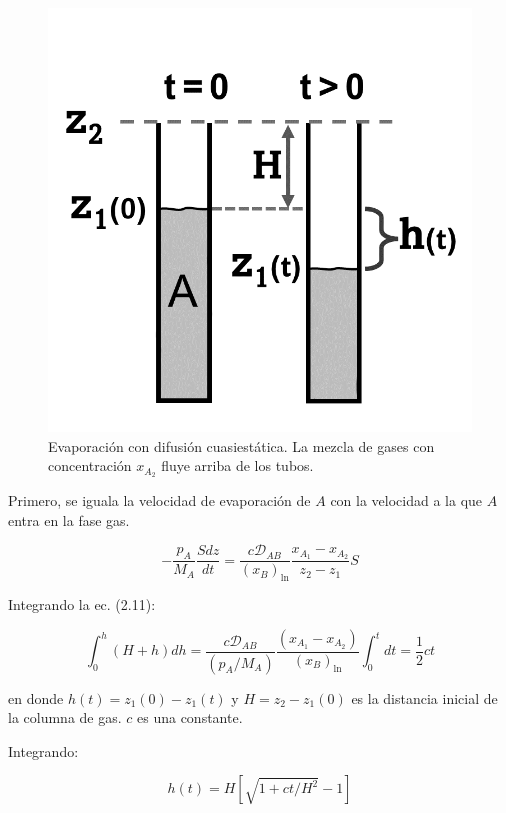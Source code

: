 \begin{figure}[H]
	\centering
	\includegraphics[scale=0.2]{./Capitulo2/Imagenes/fig-2-3.PNG}
	\caption{Evaporación con difusión cuasiestática. La mezcla de gases con concentración $x_{A_2}$ fluye arriba de los tubos.}
	\end{figure}
	
Primero, se iguala la velocidad de evaporación de $A$ con la velocidad a la que $A$ entra en la fase gas.

\begin{equation}
-\frac{p_A}{M_A} \frac{Sdz}{dt} = \frac{c \mathcal{D}_{AB}}{(x_B)_{\ln}} \frac{x_{A_1}-x_{A_2}}{z_2 - z_1} S
\end{equation}

Integrando la ec. (2.11): 

\begin{equation}
	\int_0^h (H+h)dh = \frac{c \mathcal{D}_{AB}}{(p_A/M_A)} \frac{(x_{A_1}-x_{A_2})}{(x_B)_{\ln}} \int_0^t dt = \frac{1}{2}c t
\end{equation}

en donde $h(t) = z_1(0) - z_1(t)$ y $H = z_2 - z_1(0)$ es la distancia inicial de la columna de gas. $c$ es una constante.

Integrando: 

\begin{equation}
	h(t) = H \left[ \sqrt{1+ct/H^2}-1 \right]
\end{equation}

